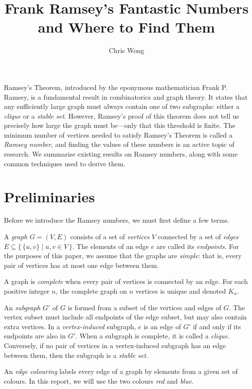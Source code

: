 \documentclass{article}
\begin{document}
\author{Chris Wong}
\title{Frank Ramsey's Fantastic Numbers and Where to Find Them}
\maketitle

Ramsey's Theorem, introduced by the eponymous mathematician Frank P. Ramsey, is a fundamental result in combinatorics and graph theory. It states that any sufficiently large graph must always contain one of two subgraphs: either a \textit{clique} or a \textit{stable set}. However, Ramsey's proof of this theorem does not tell us precisely how large the graph must be---only that this threshold is finite. The minimum number of vertices needed to satisfy Ramsey's Theorem is called a \textit{Ramsey number}, and finding the values of these numbers is an active topic of research. We summarise existing results on Ramsey numbers, along with some common techniques used to derive them.

\section{Preliminaries}

Before we introduce the Ramsey numbers, we must first define a few terms.

A \textit{graph} $G = (V, E)$ consists of a set of \textit{vertices} $V$ connected by a set of \textit{edges} $E \subseteq \{\, \{u, v\} \mid u, v \in V \,\}$. The elements of an edge $e$ are called its \textit{endpoints}. For the purposes of this paper, we assume that the graphs are \textit{simple}: that is, every pair of vertices has at most one edge between them.

A graph is \textit{complete} when every pair of vertices is connected by an edge. For each positive integer $n$, the complete graph on $n$ vertices is unique and denoted $K_n$.

An \textit{subgraph} $G'$ of $G$ is formed from a subset of the vertices and edges of $G$. The vertex subset must include all endpoints of the edge subset, but may also contain extra vertices. In a \textit{vertex-induced} subgraph, $e$ is an edge of $G'$ if and only if its endpoints are also in $G'$. When a subgraph is complete, it is called a \textit{clique}. Conversely, if no pair of vertices in a vertex-induced subgraph has an edge between them, then the subgraph is a \textit{stable set}.

An \textit{edge colouring} labels every edge of a graph by elements from a given set of colours. In this report, we will use the two colours \textit{red} and \textit{blue}.
\end{document}
